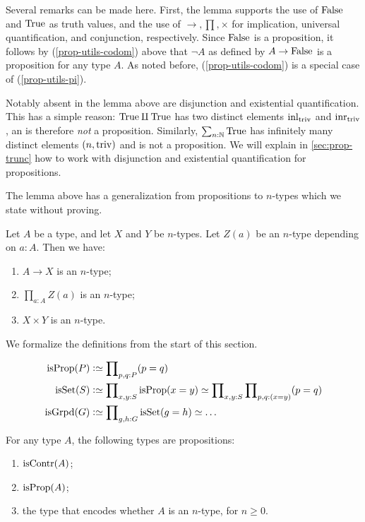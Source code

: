 Several remarks can be made here. First, the lemma supports the
use of $\mathrm{False}$ and $\mathrm{True}$ as truth values, and the use of
$\to,\prod,\times$ for implication, universal quantification,
and conjunction, respectively. Since $\mathrm{False}$ is a proposition,
it follows by (\ref{prop-utils-codom}) above that
$\neg A$ as defined by $A\to\mathrm{False}$ is a proposition for any type $A$.
As noted before, (\ref{prop-utils-codom}) is a
special case of (\ref{prop-utils-pi}).

Notably absent in the lemma above are disjunction
and existential quantification. This has a simple reason:
$\mathrm{True}\amalg \mathrm{True}$ has two distinct elements
$\inl{\triv}$ and $\inr{\triv}$, an is therefore \emph{not} a proposition.
Similarly, $\sum_{n:\mathbb{N}} \mathrm{True}$ has infinitely many
distinct elements $(n,\mathrm{triv})$ and is not a proposition. We will explain 
in \cref{sec:prop-trunc} how to work with disjunction and 
existential quantification for propositions.

The lemma above has a generalization from propositions to
$n$-types which we state without proving.

\begin{lemma}\label{lem:level-n-utils}
Let $A$ be a type, and let $X$ and $Y$ be $n$-types.
Let $Z(a)$ be an $n$-type depending on $a:A$. Then we have:

\begin{enumerate}
\item\label{level-n-utils-codom} $A\to X$ is an $n$-type;
\item\label{level-n-utils-pi} $\prod_{a:A} Z(a)$ is an $n$-type;
\item\label{level-n-utils-times} $X\times Y$ is an $n$-type.
\end{enumerate}
\end{lemma}

We formalize the definitions from the start of this section.
\begin{definition}\label{def:isSet}
\begin{align*}
\isprop(P) &\defeq\prod\nolimits_{p,q:P}(p=q)\\
\isset(S) &\defeq\prod\nolimits_{x,y:S}\isprop(x=y)\jdeq
                  \prod\nolimits_{x,y:S}\prod\nolimits_{p,q:(x=y)}(p=q)\\
\isgrpd(G) &\defeq\prod\nolimits_{g,h:G}\isset(g=h)\jdeq \ldots\\
\end{align*}
\end{definition}

\begin{lemma}\label{lem:isX-is-prop}
  For any type $A$, the following types are propositions:
  \begin{enumerate}
    \item $\mathrm{isContr}(A)$;
    \item $\mathrm{isProp}(A)$;
    \item the type that encodes whether $A$ is an $n$-type, for $n \ge 0$.
  \end{enumerate}
\end{lemma}

